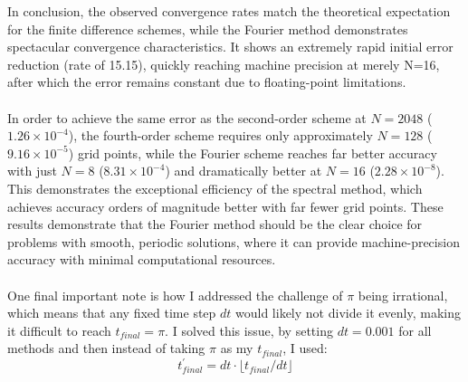 In conclusion, the observed convergence rates match the theoretical expectation for the finite difference schemes, while the Fourier method demonstrates spectacular convergence characteristics. It shows an extremely rapid initial error reduction (rate of 15.15), quickly reaching machine precision at merely N=16, after which the error remains constant due to floating-point limitations.\\
\\
In order to achieve the same error as the second-order scheme at $N=2048$ ($1.26 \times 10^{-4}$), the fourth-order scheme requires only approximately $N=128$ ($9.16 \times 10^{-5}$) grid points, while the Fourier scheme reaches far better accuracy with just $N=8$ ($8.31 \times 10^{-4}$) and dramatically better at $N=16$ ($2.28 \times 10^{-8}$). This demonstrates the exceptional efficiency of the spectral method, which achieves accuracy orders of magnitude better with far fewer grid points. These results demonstrate that the Fourier method should be the clear choice for problems with smooth, periodic solutions, where it can provide machine-precision accuracy with minimal computational resources.\\
\\
One final important note is how I addressed the challenge of $\pi$ being irrational, which means that any fixed time step $dt$ would likely not divide it evenly, making it difficult to reach $t_{final} = \pi$. I solved this issue, by setting $dt=0.001$ for all methods and then instead of taking $\pi$ as my $t_{final}$, I used:
\begin{equation}
	t^\prime_{final} = dt \cdot \lfloor t_{final} / dt \rfloor
	\label{eq:tfinal}
\end{equation}

